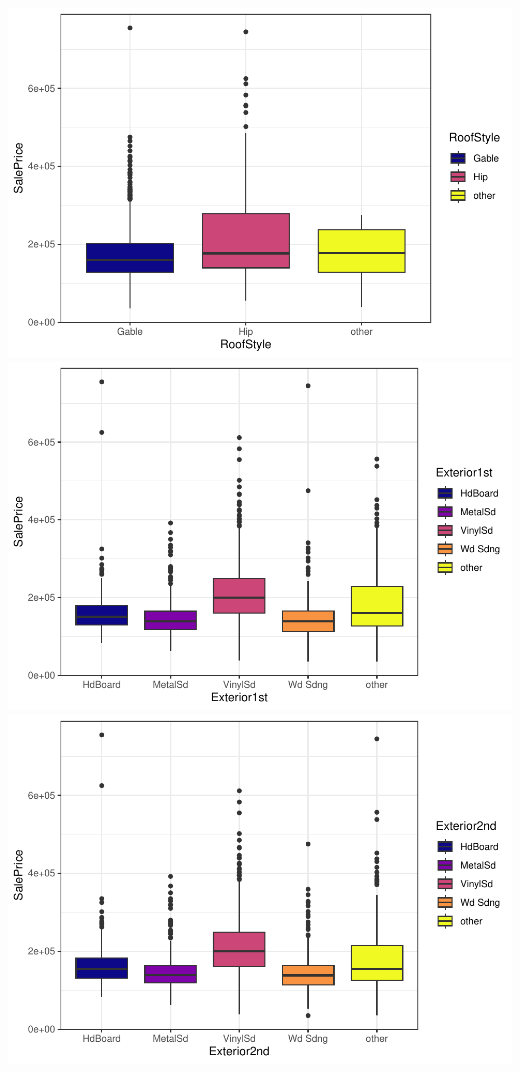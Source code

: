 \documentclass[
]{article}
\begin{document}
\includegraphics{report_files/figure-latex/categorical variables-10.pdf}
\includegraphics{report_files/figure-latex/categorical variables-11.pdf}
\includegraphics{report_files/figure-latex/categorical variables-12.pdf}
\end{document}
